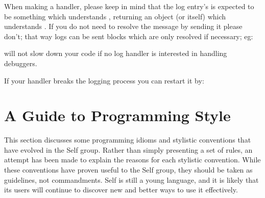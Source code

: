 \documentclass[letterpaper,10pt,english]{sphinxmanual}
\begin{document}
When making a handler, please keep in mind that the log entry's  is expected to be something which understands , returning an object (or itself) which understands . If you do not need to resolve the message by sending it  please don't; that way logs can be sent blocks which are only resolved if necessary; eg:

\begin{sphinxVerbatim}[commandchars=\\\{\}]
  \PYG{p}{[} \PYG{p}{]}
\end{sphinxVerbatim}

will not slow down your code if no log handler is interested in handling debuggers.

If your handler breaks the logging process you can restart it by:

\begin{sphinxVerbatim}[commandchars=\\\{\}]
  
\end{sphinxVerbatim}


\chapter{A Guide to Programming Style}
\label{\detokenize{progguid:a-guide-to-programming-style}}\label{\detokenize{progguid::doc}}
This section discusses some programming idioms and stylistic conventions that have evolved in the
Self group. Rather than simply presenting a set of rules, an attempt has been made to explain the
reasons for each stylistic convention. While these conventions have proven useful to the Self
group, they should be taken as guidelines, not commandments. Self is still a young language, and
it is likely that its users will continue to discover new and better ways to use it effectively.
\end{document}
